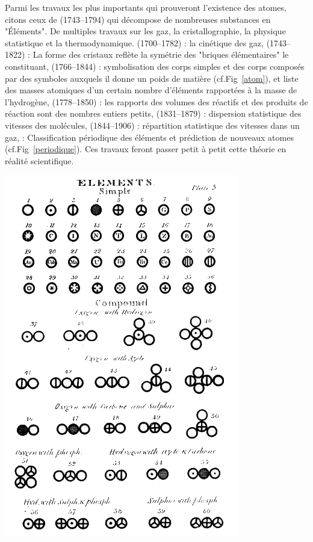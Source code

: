  Parmi les travaux les plus importants qui prouveront l'existence des atomes, citons ceux de  (\num{1743}--\num{1794}) qui décompose de nombreuses substances en "Éléments". De multiples travaux sur les gaz, la cristallographie, la physique statistique et la thermodynamique.  (\num{1700}--\num{1782}) : la cinétique des gaz,  (\num{1743}--\num{1822}) : La forme des cristaux reflète la symétrie des "briques élémentaires" le constituant,  (\num{1766}--\num{1844}) : symbolisation des corps simples et des corps composés par des symboles auxquels il donne un poids de matière (cf.Fig~\ref{atom}), et liste des masses atomiques d'un certain nombre d'éléments rapportées à la masse de l'hydrogène,  (\num{1778}--\num{1850}) : les rapports des volumes des réactifs et des produits de réaction sont des nombres entiers petits,  (\num{1831}--\num{1879}) : dispersion statistique des vitesses des molécules,  (\num{1844}--\num{1906}) : répartition statistique des vitesses dans un gaz,  : Classification périodique des éléments et prédiction de nouveaux atomes (cf.Fig~\ref{periodique}). Ces travaux feront passer petit à petit cette théorie en réalité scientifique. 
 
\marginpar
{
	\includegraphics[width=\marginparwidth]{SM/Dalton.png}
    \label{atom}
}


